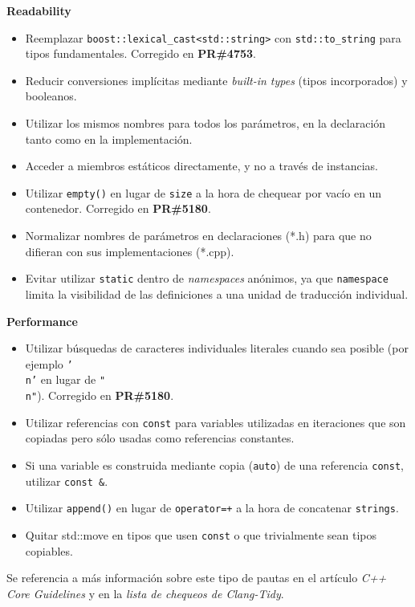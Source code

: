 \textbf{Readability}
\begin{itemize}
  \item Reemplazar \texttt{boost::lexical\_cast<std::string>} con \texttt{std::to\_string} para tipos fundamentales. Corregido en \textbf{PR\#4753}\cite{GHPR4753}.
  \item Reducir conversiones implícitas mediante \textit{built-in types} (tipos incorporados) y booleanos.
  \item Utilizar los mismos nombres para todos los parámetros, en la declaración tanto como en la implementación.
  \item Acceder a miembros estáticos directamente, y no a través de instancias.
  \item Utilizar \texttt{empty()} en lugar de \texttt{size} a la hora de chequear por vacío en un contenedor. Corregido en \textbf{PR\#5180}\cite{GHPR5180}.
  \item Normalizar nombres de parámetros en declaraciones (*.h) para que no difieran con sus implementaciones (*.cpp).
  \item Evitar utilizar \texttt{static} dentro de \textit{namespaces} anónimos, ya que \texttt{namespace} limita la visibilidad de las definiciones a una unidad de traducción individual.\\
\end{itemize}

\textbf{Performance}
\begin{itemize}
  \item Utilizar búsquedas de caracteres individuales literales cuando sea posible (por ejemplo \texttt{'\\n'} en lugar de \texttt{"\\n"}). Corregido en \textbf{PR\#5180}\cite{GHPR5180}.
  \item Utilizar referencias con \texttt{const} para variables utilizadas en iteraciones que son copiadas pero sólo usadas como referencias constantes.
  \item Si una variable es construida mediante copia (\texttt{auto}) de una referencia \texttt{const}, utilizar \texttt{const \&}.
  \item Utilizar \texttt{append()} en lugar de \texttt{operator=+} a la hora de concatenar \texttt{strings}.
  \item Quitar std::move en tipos que usen \texttt{const} o que trivialmente sean tipos copiables.
\end{itemize}

Se referencia a más información sobre este tipo de pautas en el artículo \textit{C++ Core Guidelines}\cite{CPPCoreGuidelines} y en la \textit{lista de chequeos de Clang-Tidy}\cite{ClangTidyChecks}. 